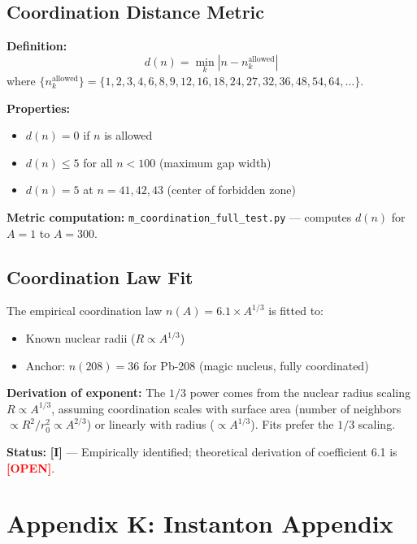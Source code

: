 \documentclass[11pt,a4paper]{article}
\newcommand{\tagI}{\textcolor{orange!80!black}{\textbf{[I]}}}
\newcommand{\tagOPEN}{\textcolor{red}{\textbf{[OPEN]}}}
\begin{document}
\subsection{Coordination Distance Metric}

\textbf{Definition:}
\begin{equation}
    d(n) = \min_{k} \left| n - n_k^{\text{allowed}} \right|
\end{equation}
where $\{n_k^{\text{allowed}}\} = \{1, 2, 3, 4, 6, 8, 9, 12, 16, 18, 24, 27, 32, 36, 48, 54, 64, \ldots\}$.

\textbf{Properties:}
\begin{itemize}[nosep]
    \item $d(n) = 0$ if $n$ is allowed
    \item $d(n) \leq 5$ for all $n < 100$ (maximum gap width)
    \item $d(n) = 5$ at $n = 41, 42, 43$ (center of forbidden zone)
\end{itemize}

\textbf{Metric computation:} \texttt{m\_coordination\_full\_test.py} --- computes $d(n)$ for $A = 1$ to $A = 300$.

\subsection{Coordination Law Fit}

The empirical coordination law $n(A) = 6.1 \times A^{1/3}$ is fitted to:
\begin{itemize}[nosep]
    \item Known nuclear radii ($R \propto A^{1/3}$)
    \item Anchor: $n(208) = 36$ for Pb-208 (magic nucleus, fully coordinated)
\end{itemize}

\textbf{Derivation of exponent:} The $1/3$ power comes from the nuclear radius scaling $R \propto A^{1/3}$, assuming coordination scales with surface area (number of neighbors $\propto R^2 / r_0^2 \propto A^{2/3}$) or linearly with radius ($\propto A^{1/3}$). Fits prefer the $1/3$ scaling.

\textbf{Status:} \tagI{} --- Empirically identified; theoretical derivation of coefficient 6.1 is \tagOPEN{}.

\section{Appendix K: Instanton Appendix}
\label{app:instanton}
\end{document}
